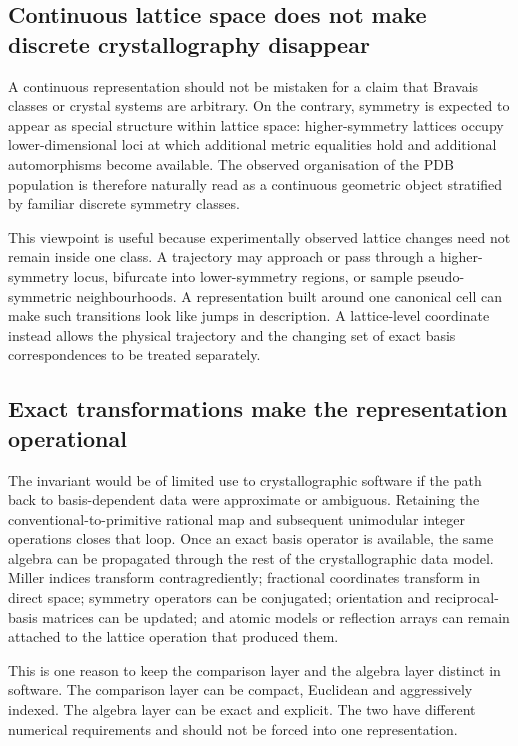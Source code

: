 \documentclass[11pt]{article}
\begin{document}
\subsection{Continuous lattice space does not make discrete crystallography disappear}

A continuous representation should not be mistaken for a claim that Bravais classes or crystal systems are arbitrary. On the contrary, symmetry is expected to appear as special structure within lattice space: higher-symmetry lattices occupy lower-dimensional loci at which additional metric equalities hold and additional automorphisms become available. The observed organisation of the PDB population is therefore naturally read as a continuous geometric object stratified by familiar discrete symmetry classes.

This viewpoint is useful because experimentally observed lattice changes need not remain inside one class. A trajectory may approach or pass through a higher-symmetry locus, bifurcate into lower-symmetry regions, or sample pseudo-symmetric neighbourhoods. A representation built around one canonical cell can make such transitions look like jumps in description. A lattice-level coordinate instead allows the physical trajectory and the changing set of exact basis correspondences to be treated separately.

\subsection{Exact transformations make the representation operational}

The invariant would be of limited use to crystallographic software if the path back to basis-dependent data were approximate or ambiguous. Retaining the conventional-to-primitive rational map and subsequent unimodular integer operations closes that loop. Once an exact basis operator is available, the same algebra can be propagated through the rest of the crystallographic data model. Miller indices transform contragrediently; fractional coordinates transform in direct space; symmetry operators can be conjugated; orientation and reciprocal-basis matrices can be updated; and atomic models or reflection arrays can remain attached to the lattice operation that produced them.

This is one reason to keep the comparison layer and the algebra layer distinct in software. The comparison layer can be compact, Euclidean and aggressively indexed. The algebra layer can be exact and explicit. The two have different numerical requirements and should not be forced into one representation.
\end{document}
